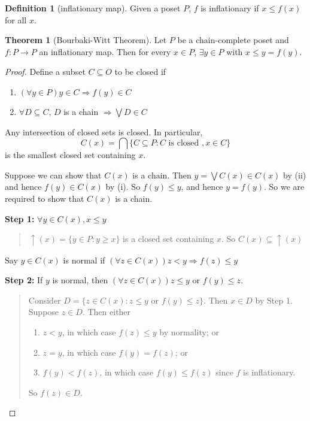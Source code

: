 \documentclass[a4paper]{article}
\theoremstyle{definition}
\newtheorem*{thm}{Theorem}
\newtheorem*{defi}{Definition}
\begin{document}
\begin{defi}[inflationary map]
  Given a poset $P$, $f$ is inflationary if $x\leq f(x)$ for all $x$.
\end{defi}

\begin{thm}[Bourbaki-Witt Theorem]
  Let $P$ be a chain-complete poset and $f: P\to P$ an inflationary map. Then for every $x\in P$, $\exists y\in P$ with $x\leq y = f(y)$.
\end{thm}

\begin{proof}
  Define a subset $C\subseteq O$ to be closed if
  \begin{enumerate}
  \item $(\forall y\in P) y\in C \Rightarrow f(y) \in C$
  \item $\forall D\subseteq C$, $D$ is a chain $\Rightarrow \bigvee D\in C$
  \end{enumerate}

  Any intersection of closed sets is closed. In particular, 
$$C(x) = \bigcap\{C\subseteq P: C\text{ is closed }, x\in C\}$$
  is the smallest closed set containing $x$.

  Suppose we can show that $C(x)$ is a chain. Then $y = \bigvee C(x)\in C(x)$ by (ii) and hence $f(y) \in C(x)$ by (i). So $f(y)\leq y$, and hence $y = f(y)$. So we are required to show that $C(x)$ is a chain.

\noindent\textbf{Step 1:} $\forall y\in C(x), x\leq y$
\begin{quote}
  $\uparrow(x) = \{y\in P: y\geq x\}$ is a closed set containing $x$. So $C(x)\subseteq \uparrow(x)$
\end{quote}
  Say $y\in C(x)$ is normal if $(\forall z\in C(x))z < y \Rightarrow f(z) \leq y$

\noindent\textbf{Step 2:} If $y$ is normal, then $(\forall z\in C(x)) z\leq y\text{ or } f(y) \leq z$.
\begin{quote}
  Consider $D = \{z\in C(x): z\leq y\text{ or }f(y)\leq z\}$. Then $x\in D$ by Step 1. Suppose $z\in D$. Then either
  \begin{enumerate}
  \item $z < y$, in which case $f(z) \leq y$ by normality; or
  \item $z = y$, in which case $f(y) = f(z)$; or
  \item $f(y) < f(z)$, in which case $f(y)\leq f(z)$ since $f$ is inflationary.
  \end{enumerate}
    So $f(z)\in D$.


\end{quote}
\end{proof}
\end{document}
